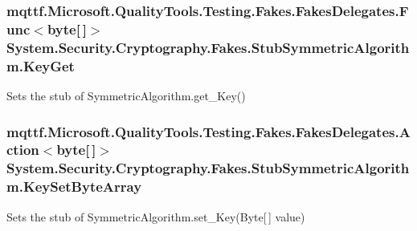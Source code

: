 \hypertarget{class_system_1_1_security_1_1_cryptography_1_1_fakes_1_1_stub_symmetric_algorithm_a6ab9bf761758da3ed1936ff2aa326458}{
\subsubsection[{Key\-Get}]{\setlength{\rightskip}{0pt plus 5cm}mqttf.\-Microsoft.\-Quality\-Tools.\-Testing.\-Fakes.\-Fakes\-Delegates.\-Func$<$byte\mbox{[}$\,$\mbox{]}$>$ System.\-Security.\-Cryptography.\-Fakes.\-Stub\-Symmetric\-Algorithm.\-Key\-Get}}\label{class_system_1_1_security_1_1_cryptography_1_1_fakes_1_1_stub_symmetric_algorithm_a6ab9bf761758da3ed1936ff2aa326458}


Sets the stub of Symmetric\-Algorithm.\-get\-\_\-\-Key()

\hypertarget{class_system_1_1_security_1_1_cryptography_1_1_fakes_1_1_stub_symmetric_algorithm_a3ef7c68edabeadeeded7627a0ffddc15}{
\subsubsection[{Key\-Set\-Byte\-Array}]{\setlength{\rightskip}{0pt plus 5cm}mqttf.\-Microsoft.\-Quality\-Tools.\-Testing.\-Fakes.\-Fakes\-Delegates.\-Action$<$byte\mbox{[}$\,$\mbox{]}$>$ System.\-Security.\-Cryptography.\-Fakes.\-Stub\-Symmetric\-Algorithm.\-Key\-Set\-Byte\-Array}}\label{class_system_1_1_security_1_1_cryptography_1_1_fakes_1_1_stub_symmetric_algorithm_a3ef7c68edabeadeeded7627a0ffddc15}


Sets the stub of Symmetric\-Algorithm.\-set\-\_\-\-Key(\-Byte\mbox{[}$\,$\mbox{]} value)

